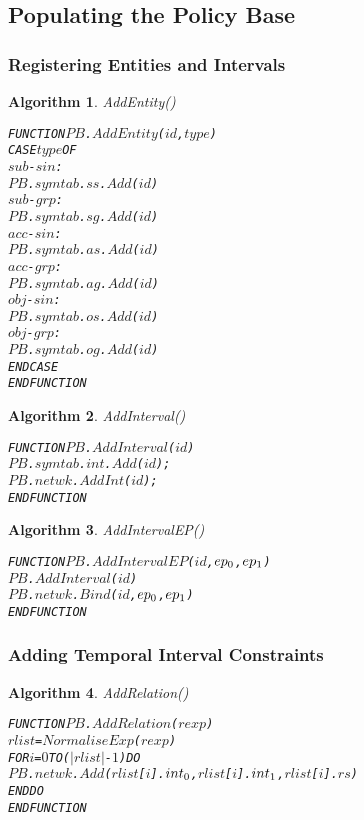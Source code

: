 \documentclass[11pt]{report}
\newenvironment{vverbatim}
{
  \begin{alltt}
}
{
    \vspace{-\baselineskip}
  \end{alltt}
}
\newtheorem{vvalgorithm}{Algorithm}[chapter]
\newenvironment{valgorithm}[2]
{
  \begin{vvalgorithm}{#1}
    \label{#2}
    \small
    \begin{vverbatim}
}
{
    \end{vverbatim}
  \end{vvalgorithm}
}
\begin{document}
      \subsection{Populating the Policy Base}

        \subsubsection{Registering Entities and Intervals}

          \begin{valgorithm}{AddEntity()}{algo-impln-adent}
FUNCTION \(PB\).\(AddEntity\)(\(id\), \(type\))
  CASE \(type\) OF
    \(sub\)-\(sin\) :
      \(PB\).\(symtab\).\(ss\).\(Add\)(\(id\))
    \(sub\)-\(grp\) :
      \(PB\).\(symtab\).\(sg\).\(Add\)(\(id\))
    \(acc\)-\(sin\) :
      \(PB\).\(symtab\).\(as\).\(Add\)(\(id\))
    \(acc\)-\(grp\) :
      \(PB\).\(symtab\).\(ag\).\(Add\)(\(id\))
    \(obj\)-\(sin\) :
      \(PB\).\(symtab\).\(os\).\(Add\)(\(id\))
    \(obj\)-\(grp\) :
      \(PB\).\(symtab\).\(og\).\(Add\)(\(id\))
  ENDCASE
ENDFUNCTION
          \end{valgorithm}

          \begin{valgorithm}{AddInterval()}{algo-impln-adint}
FUNCTION \(PB\).\(AddInterval\)(\(id\))
  \(PB\).\(symtab\).\(int\).\(Add\)(\(id\));
  \(PB\).\(netwk\).\(AddInt\)(\(id\));
ENDFUNCTION
          \end{valgorithm}

          \begin{valgorithm}{AddIntervalEP()}{algo-impln-adine}
FUNCTION \(PB\).\(AddIntervalEP\)(\(id\), \(ep\sb{0}\), \(ep\sb{1}\))
  \(PB\).\(AddInterval\)(\(id\))
  \(PB\).\(netwk\).\(Bind\)(\(id\), \(ep\sb{0}\), \(ep\sb{1}\))
ENDFUNCTION
          \end{valgorithm}

        \subsubsection{Adding Temporal Interval Constraints}

          \begin{valgorithm}{AddRelation()}{algo-impln-adrel}
FUNCTION \(PB\).\(AddRelation\)(\(rexp\))
  \(rlist\) = \(NormaliseExp\)(\(rexp\))
  FOR \(i\) = \(0\) TO (\(|rlist|\) - \(1\)) DO
    \(PB\).\(netwk\).\(Add\)(\(rlist\)[\(i\)].\(int\sb{0}\), \(rlist\)[\(i\)].\(int\sb{1}\), \(rlist\)[\(i\)].\(rs\))
  ENDDO
ENDFUNCTION
          \end{valgorithm}
\end{document}
